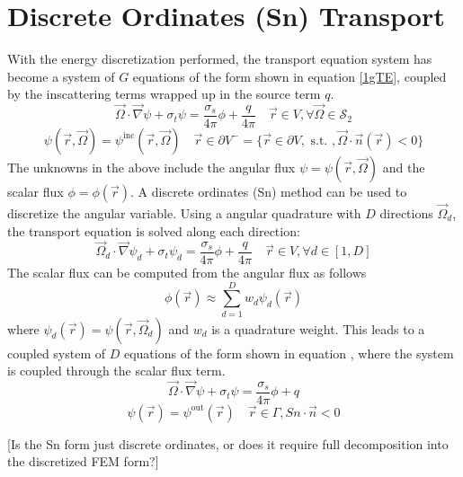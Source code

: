 \documentclass{article}
\newcommand{\vr}{\vec{r}}
\newcommand{\vO}{\vec{\Omega}}
\newcommand{\vgrad}{\vec{\nabla}}
\newcommand{\sigt}{\sigma_t}
\newcommand{\sigs}{\sigma_s}
\begin{document}
\section{Discrete Ordinates (Sn) Transport}
With the energy discretization performed, the transport equation system has become a system of $G$ equations of the form shown in equation \ref{1gTE}, coupled by the inscattering terms wrapped up in the source term $q$.
\begin{equation}
\label{1gTE}
\vO \cdot \vgrad \psi + \sigt \psi = \frac{\sigs}{4 \pi} \phi + \frac{q}{4 \pi} \quad \vr \in V , \forall \vO \in \mathcal{S}_2
\end{equation}
\begin{equation}
\psi(\vr,\vO) = \psi^{\text{inc}}(\vr,\vO) \quad \vr \in \partial V^{-} = \{ \vr \in \partial V, \text{ s.t. }, \vO \cdot \vec{n}(\vr) < 0\}
\end{equation}
The unknowns in the above include the angular flux $\psi=\psi(\vr,\vO)$ and the scalar flux $\phi=\phi(\vr)$. A discrete ordinates (Sn) method can be used to discretize the angular variable. Using a angular quadrature with $D$ directions $\vO_d$, the transport equation is solved along each direction:
\begin{equation}
\label{1gTE}
\vO_d \cdot \vgrad \psi_d + \sigt \psi_d = \frac{\sigs}{4 \pi} \phi + \frac{q}{4 \pi} \quad \vr \in V , \forall d\in [1,D]
\end{equation}
%
The scalar flux can be computed from the angular flux as follows
\[
\phi(\vr) \approx \sum_{d=1}^D w_d \psi_d(\vr)
\] 
where $\psi_d(\vr) = \psi(\vr, \vO_d)$ and $w_d$ is a quadrature weight. This leads to a coupled system of $D$ equations of the form shown in equation \cite{SnFwd}, where the system is coupled through the scalar flux term.
%
\begin{equation}
\label{snFwd}
\vO \cdot \vgrad \psi + \sigt \psi = \frac{\sigs}{4 \pi} \phi + q
\end{equation}
\begin{equation}
\psi(\vr) = \psi^{\text{out}}(\vr) \quad \vr \in \Gamma, Sn \cdot \vec{n} < 0
\end{equation}

{\color{red}[Is the Sn form just discrete ordinates, or does it require full decomposition into the discretized FEM form?]}

\end{document}
